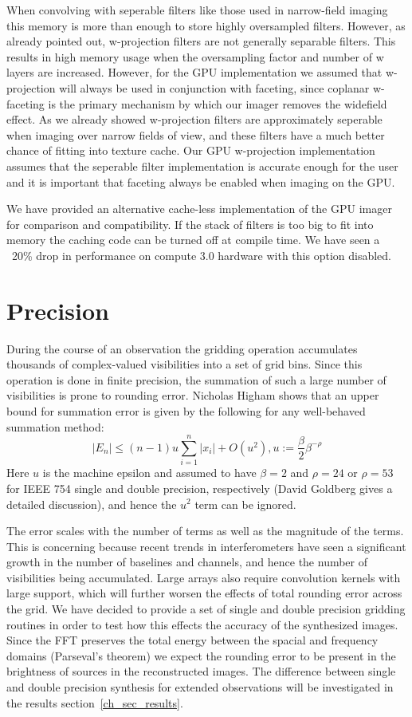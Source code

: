 When convolving with seperable filters like those used in narrow-field imaging this memory is more than enough to store highly oversampled filters. However, 
as already pointed out, w-projection filters are not generally separable filters. This results in high memory usage when the oversampling factor and number of w layers are 
increased. However, for the GPU implementation we assumed that w-projection will always be used in conjunction with faceting, since coplanar w-faceting
is the primary mechanism by which our imager removes the widefield effect. As we already showed w-projection filters are approximately seperable when 
imaging over narrow fields of view, and these filters have a much better chance of fitting into texture cache. Our GPU w-projection implementation
assumes that the seperable filter implementation is accurate enough for the user and it is important that faceting always be enabled when imaging on 
the GPU.

We have provided an alternative cache-less implementation of the GPU imager for comparison and compatibility.
If the stack of filters is too big to fit into memory the caching code can be turned off at compile time. We have seen
a ~20\% drop in performance on compute 3.0 hardware with this option disabled.

\section{Precision}
During the course of an observation the gridding operation accumulates thousands of complex-valued visibilities into a set of grid bins. Since this operation
is done in finite precision, the summation of such a large number of visibilities is prone to rounding error. Nicholas Higham \cite{higham1993accuracy} shows that
an upper bound for summation error is given by the following for any well-behaved summation method:
\begin{equation}
 |E_n| \leq (n-1)u\sum_{i=1}^{n}{|x_i|} + O(u^2), u := \frac{\beta}{2}\beta^{-\rho}
\end{equation}
Here $u$ is the machine epsilon and assumed to have $\beta=2$ and $\rho=24$ or $\rho=53$ for IEEE 754 single and double precision, respectively (David Goldberg \cite{goldberg1991every}
gives a detailed discussion), and hence the $u^2$ term can be ignored.

The error scales with the number of terms as well as the magnitude of the terms. This is concerning because recent trends in interferometers have
seen a significant growth in the number of baselines and channels, and hence the number of visibilities being accumulated. Large arrays also require
convolution kernels with large support, which will further worsen the effects of total rounding error across the grid. We have decided to provide 
a set of single and double precision gridding routines in order to test how this effects the accuracy of the synthesized images. Since the FFT preserves
the total energy between the spacial and frequency domains (Parseval's theorem) we expect the rounding error to be present in the brightness of sources in 
the reconstructed images. The difference between single and double precision synthesis for extended observations will be investigated in the results 
section~\ref{ch_sec_results}.

